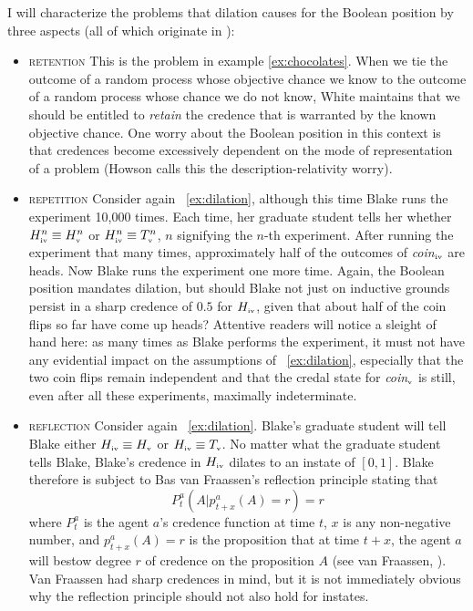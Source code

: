 \documentclass[phd,12pt,oneside]{ubcthesis}
\begin{document}
{\noindent}I will characterize the problems that dilation causes for the Boolean
position by three aspects (all of which originate in
):

\begin{itemize}
\item \textsc{retention} This is the problem in example
  \ref{ex:chocolates}. When we tie the outcome of a random process
  whose objective chance we know to the outcome of a random process
  whose chance we do not know, White maintains that we should be
  entitled to \emph{retain} the credence that is warranted by the
  known objective chance. One worry about the Boolean position in this
  context is that credences become excessively dependent on the mode
  of representation of a problem (Howson calls this the
  description-relativity worry).
\item \textsc{repetition} Consider again {\xample}~\ref{ex:dilation},
  although this time Blake runs the experiment 10,000 times. Each
  time, her graduate student tells her whether
  $H^{n}_{\mbox{\tiny{iv}}}\equiv{}H^{n}_{\mbox{\tiny{v}}}$ or
  $H^{n}_{\mbox{\tiny{iv}}}\equiv{}T^{n}_{\mbox{\tiny{v}}}$, $n$
  signifying the $n$-th experiment. After running the experiment that
  many times, approximately half of the outcomes of
  \textit{coin}$_{\mbox{\tiny{iv}}}$ are heads. Now Blake runs the
  experiment one more time. Again, the Boolean position mandates
  dilation, but should Blake not just on inductive grounds persist in
  a sharp credence of $0.5$ for $H_{\mbox{\tiny{iv}}}$, given that
  about half of the coin flips so far have come up heads? Attentive
  readers will notice a sleight of hand here: as many times as Blake
  performs the experiment, it must not have any evidential impact on
  the assumptions of {\xample}~\ref{ex:dilation}, especially that the
  two coin flips remain independent and that the credal state for 
  \textit{coin}$_{\mbox{\tiny{v}}}$ is still, even after all these
  experiments, maximally indeterminate. 
\item \textsc{reflection} Consider again {\xample}~\ref{ex:dilation}.
  Blake's graduate student will tell Blake either
  $H_{\mbox{\tiny{iv}}}\equiv{}H_{\mbox{\tiny{v}}}$ or
  $H_{\mbox{\tiny{iv}}}\equiv{}T_{\mbox{\tiny{v}}}$. No matter what
  the graduate student tells Blake, Blake's credence in
  $H_{\mbox{\tiny{iv}}}$ dilates to an instate of $[0,1]$. Blake
  therefore is subject to Bas van Fraassen's reflection principle
  stating that
  \begin{equation}
    \label{eq:reflection}
    P_{t}^{a}(A|p_{t+x}^{a}(A)=r)=r
  \end{equation}
  where $P_{t}^{a}$ is the agent $a$'s credence function at time $t$,
  $x$ is any non-negative number, and $p_{t+x}^{a}(A)=r$ is the
  proposition that at time $t+x$, the agent $a$ will bestow degree $r$
  of credence on the proposition $A$ (see van
  Fraassen, ). Van Fraassen had sharp
  credences in mind, but it is not immediately obvious why the
  reflection principle should not also hold for instates.
\end{itemize}
\end{document}
